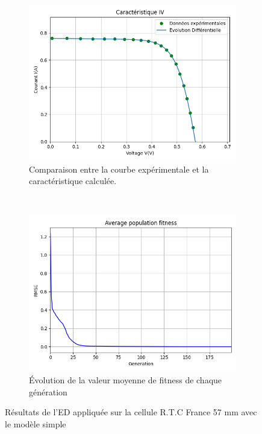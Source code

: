 \begin{figure}
    \centering
    \begin{subfigure}[b]{0.45\textwidth}
        \includegraphics[width=\textwidth]{resources/RTCFrance/singled/iv.png}
        \caption{Comparaison entre la courbe expérimentale et la caractéristique calculée.}
    \end{subfigure}
    ~
    \begin{subfigure}[b]{0.45\textwidth}
        \includegraphics[width=\textwidth]{resources/RTCFrance/singled/fitness.png}
        \caption{Évolution de la valeur moyenne de fitness de chaque génération}
    \end{subfigure}
    \caption{Résultats de l'ED appliquée sur la cellule R.T.C France 57 mm avec le modèle simple}
    \label{fig:RTCres}
\end{figure}

